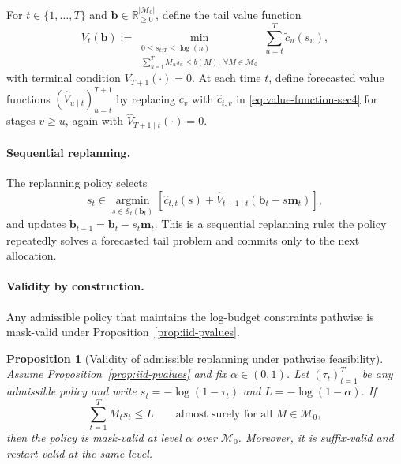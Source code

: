 \documentclass{uai2026} %
\newtheorem{proposition}[theorem]{Proposition}
\newcommand{\R}{\mathbb{R}}
\newcommand{\1}{\mathbf{1}}
\newcommand{\scalt}{\mathcal{S}_{t}}
\newcommand{\mcal}{\mathcal{M}}
\begin{document}
For $t\in\{1,\dots,T\}$ and $\mathbf{b}\in\R_{\ge 0}^{|\mcal_{0}|}$, define the tail value function
\begin{equation}
  \label{eq:value-function-sec4}
  V_t(\mathbf{b})
  :=
  \min_{\substack{0 \le s_{t:T} \le \log(n)\\
  \sum_{u=t}^{T} M_u s_u \le b(M),\ \forall M\in\mcal_{0}}}
  \sum_{u=t}^{T} \tilde{c}_u(s_u),
\end{equation}
with terminal condition $V_{T+1}(\cdot)=0$.
At each time $t$, define forecasted value functions $(\hat{V}_{u\mid t})_{u=t}^{T+1}$ by replacing $\tilde{c}_v$ with $\hat{c}_{t,v}$ in \eqref{eq:value-function-sec4} for stages $v\ge u$, again with $\hat{V}_{T+1\mid t}(\cdot)=0$.

\paragraph{Sequential replanning.}
The replanning policy selects
\begin{equation}
  \label{eq:replan-action}
  s_t \in \operatorname*{argmin}_{s\in\scalt(\mathbf{b}_t)}
  \left[\hat{c}_{t,t}(s) + \hat{V}_{t+1\mid t}(\mathbf{b}_t-s\mathbf{m}_t)\right],
\end{equation}
and updates $\mathbf{b}_{t+1}=\mathbf{b}_t-s_t\mathbf{m}_t$.
This is a sequential replanning rule: the policy repeatedly solves a forecasted tail problem and commits only to the next allocation.

\paragraph{Validity by construction.}
Any admissible policy that maintains the log-budget constraints pathwise is mask-valid under Proposition~\ref{prop:iid-pvalues}.
\begin{proposition}[Validity of admissible replanning under pathwise feasibility]
  \label{prop:replan-validity}
  Assume Proposition~\ref{prop:iid-pvalues} and fix $\alpha\in(0,1)$.
  Let $(\tau_t)_{t=1}^{T}$ be any admissible policy and write $s_t=-\log(1-\tau_t)$ and $L=-\log(1-\alpha)$.
  If
  \begin{equation*}
    \sum_{t=1}^{T} M_t s_t \le L
    \qquad \text{almost surely for all }M\in\mcal_{0},
  \end{equation*}
  then the policy is mask-valid at level $\alpha$ over $\mcal_{0}$.
  Moreover, it is suffix-valid and restart-valid at the same level.
\end{proposition}
\end{document}
